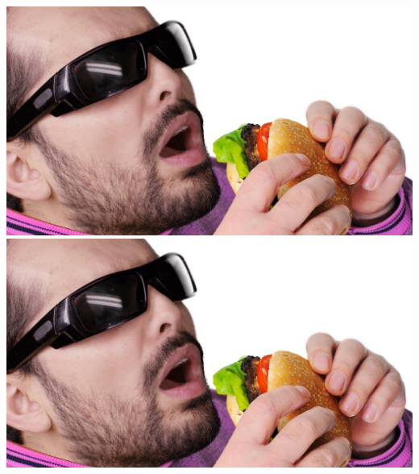 \documentclass[12pt]{article}
\begin{document}
\includegraphics[width=.8\textwidth]{stockphoto1.jpg}
\includegraphics[width=.9\textwidth]{stockphoto1.jpg}
\clearpage
{}
\end{document}
